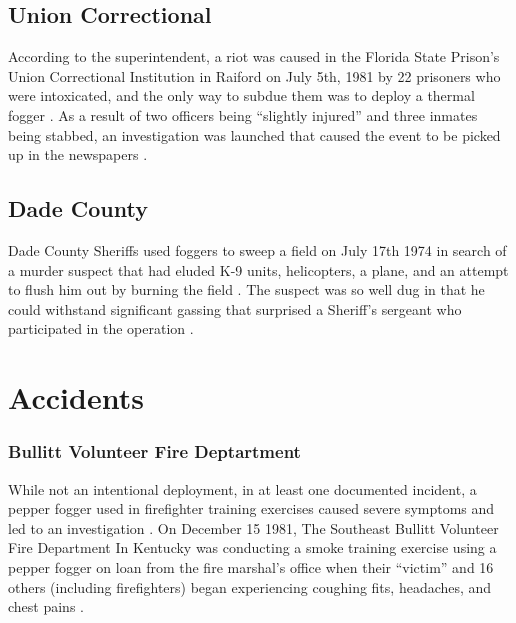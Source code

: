 \documentclass[
  12pt,
]{krantz}
\begin{document}
\hypertarget{union-correctional}{%
\section*{Union Correctional}\label{union-correctional}}


According to the superintendent, a riot was caused in the Florida State Prison's Union Correctional Institution in Raiford on July 5th, 1981 by 22 prisoners who were intoxicated, and the only way to subdue them was to deploy a thermal fogger \citep{TallahasseeDemocrat1981_07_07}.
As a result of two officers being ``slightly injured'' and three inmates being stabbed, an investigation was launched that caused the event to be picked up in the newspapers \citep{TallahasseeDemocrat1981_07_07}.

\hypertarget{dade-county}{%
\section*{Dade County}\label{dade-county}}


Dade County Sheriffs used foggers to sweep a field on July 17th 1974 in search of a murder suspect that had eluded K-9 units, helicopters, a plane, and an attempt to flush him out by burning the field \citep{TampaBayTimes1974_07_18}.
The suspect was so well dug in that he could withstand significant gassing that surprised a Sheriff's sergeant who participated in the operation \citep{TampaBayTimes1974_07_18}.

\hypertarget{accidents}{%
\chapter*{Accidents}\label{accidents}}


\hypertarget{bullitt-volunteer-fire-deptartment}{%
\subsection*{Bullitt Volunteer Fire Deptartment}\label{bullitt-volunteer-fire-deptartment}}


While not an intentional deployment, in at least one documented incident, a pepper fogger used in firefighter training exercises caused severe symptoms and led to an investigation \citep{Judd1981}.
On December 15 1981, The Southeast Bullitt Volunteer Fire Department In Kentucky was conducting a smoke training exercise using a pepper fogger on loan from the fire marshal's office when their ``victim'' and 16 others (including firefighters) began experiencing coughing fits, headaches, and chest pains \citep{Judd1981}.
\end{document}
